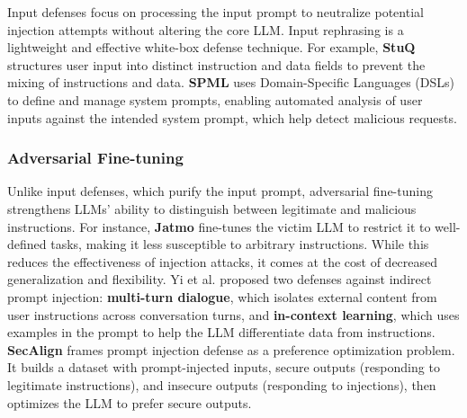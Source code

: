 Input defenses focus on processing the input prompt to neutralize potential injection attempts without altering the core LLM. Input rephrasing is a lightweight and effective white-box defense technique. For example, \textbf{StuQ} \cite{chen2024struq} structures user input into distinct instruction and data fields to prevent the mixing of instructions and data. \textbf{SPML} \cite{sharma2024spml} uses Domain-Specific Languages (DSLs) to define and manage system prompts, enabling automated analysis of user inputs against the intended system prompt, which help detect malicious requests.

\subsubsection{Adversarial Fine-tuning}

Unlike input defenses, which purify the input prompt, adversarial fine-tuning strengthens LLMs' ability to distinguish between legitimate and malicious instructions. For instance, \textbf{Jatmo} \cite{piet2023jatmo} fine-tunes the victim LLM to restrict it to well-defined tasks, making it less susceptible to arbitrary instructions. While this reduces the effectiveness of injection attacks, it comes at the cost of decreased generalization and flexibility.
Yi et al. \cite{yi2023benchmarking} proposed two defenses against indirect prompt injection: \textbf{multi-turn dialogue}, which isolates external content from user instructions across conversation turns, and \textbf{in-context learning}, which uses examples in the prompt to help the LLM differentiate data from instructions.
\textbf{SecAlign} \cite{chen2025SecAlign} frames prompt injection defense as a preference optimization problem. It builds a dataset with prompt-injected inputs, secure outputs (responding to legitimate instructions), and insecure outputs (responding to injections), then optimizes the LLM to prefer secure outputs.

